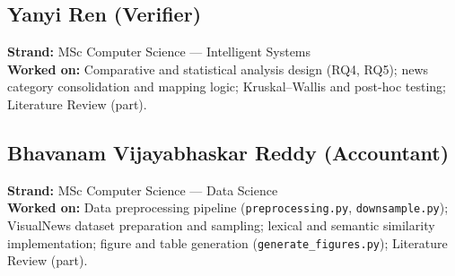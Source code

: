 \documentclass[11pt,a4paper]{article}
\begin{document}
\vspace{0.5cm}

\subsection*{Yanyi Ren (Verifier)}
\textbf{Strand:} MSc Computer Science --- Intelligent Systems\\
\textbf{Worked on:} Comparative and statistical analysis design (RQ4, RQ5);
news category consolidation and mapping logic; Kruskal--Wallis and
post-hoc testing; Literature Review (part).

\vspace{0.5cm}

\subsection*{Bhavanam Vijayabhaskar Reddy (Accountant)}
\textbf{Strand:} MSc Computer Science --- Data Science\\
\textbf{Worked on:} Data preprocessing pipeline
(\texttt{preprocessing.py}, \texttt{downsample.py}); VisualNews dataset
preparation and sampling; lexical and semantic similarity implementation;
figure and table generation (\texttt{generate\_figures.py}); Literature
Review (part).
\end{document}
